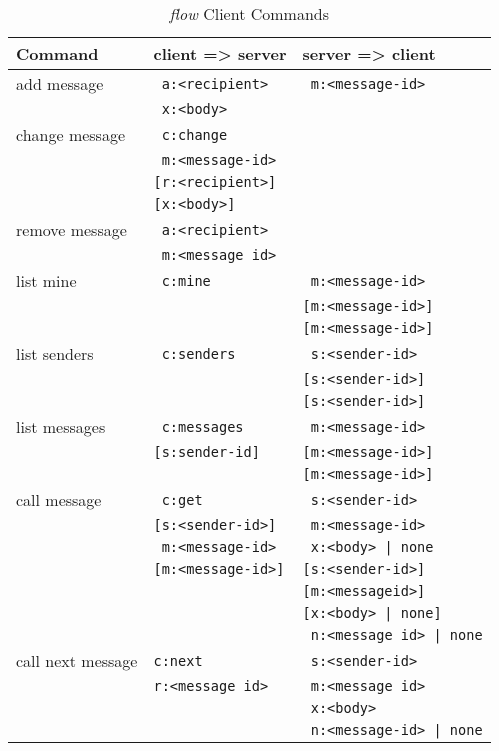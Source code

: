 \documentclass[twoside,a4paper,english,12pt,authoryear,openright]{book}
\newcommand{\flow}{\textit{flow} }
\begin{document}
\begin{table}[htdp]
\begin{center}
\begin{tabular}{ | l | l | l |  }

\hline
Command & client => server & server => client  \\
\hline

add message  & \texttt{ a:<recipient>}  & \texttt{ m:<message-id>}  \\
& \texttt{ x:<body>}  &  \\
\hline

change message  & \texttt{ c:change}  &  \\
& \texttt{ m:<message-id>}  &  \\
& \texttt{[r:<recipient>]}  &  \\
& \texttt{[x:<body>]}  &  \\
\hline

remove message  & \texttt{ a:<recipient>}  &  \\
& \texttt{ m:<message id>} &\\
\hline

list mine  & \texttt{ c:mine}  & \texttt{ m:<message-id>}  \\
&& \texttt{[m:<message-id>]}  \\
&& \texttt{[m:<message-id>]}  \\
\hline

list senders  & \texttt{ c:senders}  & \texttt{ s:<sender-id>}  \\
&& \texttt{[s:<sender-id>]}  \\
&& \texttt{[s:<sender-id>]}  \\
\hline

list messages  & \texttt{ c:messages}  & \texttt{ m:<message-id>} \\
& \texttt{[s:sender-id]}  & \texttt{[m:<message-id>]} \\
&& \texttt{[m:<message-id>]} \\
\hline

call message  & \texttt{ c:get}  &  \texttt{ s:<sender-id>}  \\
& \texttt{[s:<sender-id>]} & \texttt{ m:<message-id>}  \\
& \texttt{ m:<message-id>} & \texttt{ x:<body> | none}  \\
& \texttt{[m:<message-id>]} & \texttt{[s:<sender-id>]} \\
&& \texttt{[m:<messageid>]} \\
&& \texttt{[x:<body> | none]} \\
&& \texttt{ n:<message id> | none} \\
\hline

call next message  & \texttt{c:next}  & \texttt{ s:<sender-id>}  \\
& \texttt{r:<message id>}  & \texttt{ m:<message id>} \\
&& \texttt{ x:<body>} \\
&& \texttt{ n:<message-id> | none} \\
\hline


\end{tabular}
\end{center}
\caption{\flow Client Commands}
\label{default}
\end{table} %
\end{document}
